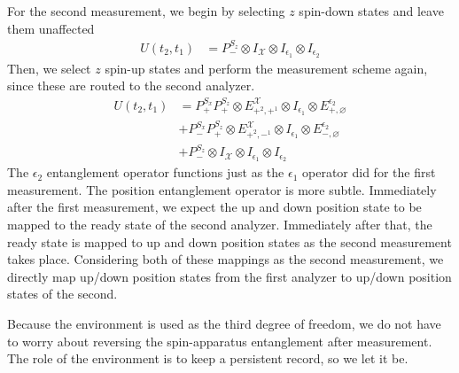 For the second measurement, we begin by selecting $z$ spin-down states and leave them unaffected
\begin{align}
  U(t_2, t_1) &=  P^{S_z}_- \otimes I_\mathcal{X} \otimes I_{\epsilon_1} \otimes I_{\epsilon_2}
\end{align}
Then, we select $z$ spin-up states and perform the measurement scheme again, since these are routed to the second analyzer.
\begin{align}
  U(t_2, t_1) &= P^{S_x}_+ P^{S_z}_+ \otimes E^\mathcal{X}_{+^2, +^1} \otimes I_{\epsilon_1} \otimes E^{\epsilon_2}_{+, \varnothing} \\ \nonumber
  &+ P^{S_x}_- P^{S_z}_+ \otimes E^\mathcal{X}_{+^2, -^1} \otimes I_{\epsilon_1} \otimes E^{\epsilon_2}_{-, \varnothing} \\ \nonumber
  &+ P^{S_z}_- \otimes I_\mathcal{X} \otimes I_{\epsilon_1} \otimes I_{\epsilon_2}
\end{align}
The $\epsilon_2$ entanglement operator functions just as the $\epsilon_1$ operator did for the first measurement. The position entanglement operator is more subtle. Immediately after the first measurement, we expect the up and down position state to be mapped to the ready state of the second analyzer. Immediately after that, the ready state is mapped to up and down position states as the second measurement takes place. Considering both of these mappings as the second measurement, we directly map up/down position states from the first analyzer to up/down position states of the second.

Because the environment is used as the third degree of freedom, we do not have to worry about reversing the spin-apparatus entanglement after measurement. The role of the environment is to keep a persistent record, so we let it be.


